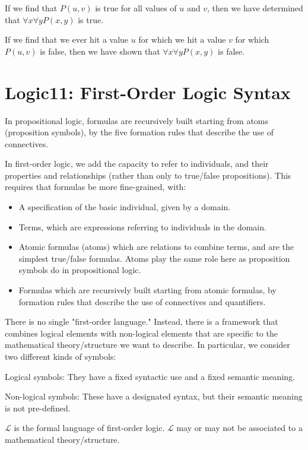 \documentclass{article}
\begin{document}
If we find that $P(u,v)$ is true for all values of $u$ and $v$, then we have determined that $\forall x \forall y P(x,y)$ is true.

If we find that we ever hit a value $u$ for which we hit a value $v$ for which $P(u,v)$ is false, then we have shown that $\forall x \forall y P(x,y)$ is false.


\section{Logic11: First-Order Logic Syntax}

In propositional logic, formulas are recursively built starting from atoms (proposition symbols), by the five formation rules that describe the use of connectives.

In first-order logic, we add the capacity to refer to individuals, and their properties and relationships (rather than only to true/false propositions). This requires that formulas be more fine-grained, with:

\begin{itemize}
    \item A specification of the basic individual, given by a domain.
    \item Terms, which are expressions referring to individuals in the domain.
    \item Atomic formulas (atoms) which are relations to combine terms, and are the simplest true/false formulas. Atoms play the same role here as proposition symbols do in propositional logic.
    \item Formulas which are recursively built starting from atomic formulas, by formation rules that describe the use of connectives and quantifiers.
\end{itemize}

There is no single "first-order language." Instead, there is a framework that combines logical elements with non-logical elements that are specific to the mathematical theory/structure we want to describe. In particular, we consider two different kinds of symbols:

Logical symbols: They have a fixed syntactic use and a fixed semantic meaning. 

Non-logical symbols: These have a designated syntax, but their semantic meaning is not pre-defined. 


$\mathcal{L}$ is the formal language of first-order logic. $\mathcal{L}$ may or may not be associated to a mathematical theory/structure.
\end{document}
